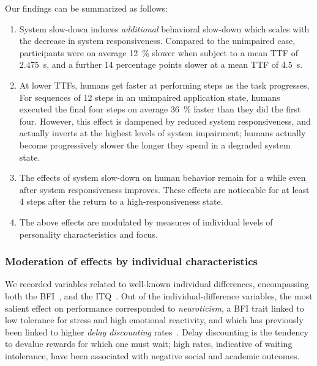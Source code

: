 
Our findings can be summarized as follows:
\begin{enumerate}
    \item System slow-down induces \emph{additional} behavioral slow-down which scales with the decrease in system responsiveness.
    Compared to the unimpaired case, participants were on average \SI{12}{\percent} slower when subject to a mean \ac{TTF} of \SI{2.475}{\second}, and a further \num{14} percentage points slower at a mean \ac{TTF} of \SI{4.5}{\second}.

    \item\label{item:speedup} At lower \acp{TTF}, humans get faster at performing steps as the task progresses, 
    For sequences of \num{12} steps in an unimpaired application state, humans executed the final four steps on average \SI{36}{\percent} faster than they did the first four.
    However, this effect is dampened by reduced system responsiveness, and actually inverts at the highest levels of system impairment; humans actually become progressively slower the longer they spend in a degraded system state.

    \item\label{item:remain} The effects of system slow-down on human behavior remain for a while even after system responsiveness improves.
    These effects are noticeable for at least \num{4} steps after the return to a high-responsiveness state. 
    
    \item The above effects are modulated by measures of individual levels of personality characteristics and focus.
\end{enumerate}

\subsubsection{Moderation of effects by individual characteristics}\label{ssec:moderationeffects}

We recorded variables related to well-known individual differences, encompassing both the \acf{BFI}~\cite{oliver:bfi1999}, and the \acf{ITQ}~\cite{witmer1998measuring}.
Out of the individual-difference variables, the most salient effect on performance corresponded to \emph{neuroticism}, a \ac{BFI} trait linked to low tolerance for stress and high emotional reactivity, and which has previously been linked to higher \emph{delay discounting} rates~\cite{hirsh2008delay}.
Delay discounting is the tendency to devalue rewards for which one must wait; high rates, indicative of waiting intolerance, have been associated with negative social and academic outcomes.

